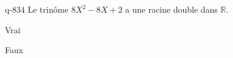 \begin{truefalse}{q-834}
Le trinôme $8X^2-8X+2$ a une racine double dans $\mathbb R$.
\item* Vrai
\item Faux
\end{truefalse}

